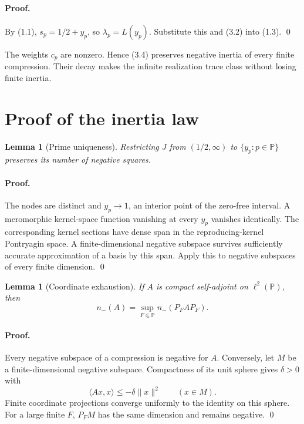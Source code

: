 \documentclass[11pt]{article}
\newtheorem{lemma}[theorem]{Lemma}
\theoremstyle{definition}
\theoremstyle{remark}
\newcommand{\PP}{\mathbb P}
\newcommand{\nm}{n_{-}}
\newcommand{\ip}[2]{\langle #1,#2\rangle}
\newcommand{\norm}[1]{\lVert #1\rVert}
\begin{document}
\paragraph{Proof.}
By (1.1), $s_p=1/2+y_p$, so $\lambda_p=L(y_p)$.  Substitute this and (3.2) into (1.3). \qed

The weights $c_p$ are nonzero.  Hence (3.4) preserves negative inertia of every finite
compression.  Their decay makes the infinite realization trace class without losing finite
inertia.

\section{Proof of the inertia law}
\label{sec:proof}

\begin{lemma}[Prime uniqueness]
\label{lem:unique}
Restricting $J$ from $(1/2,\infty)$ to $\{y_p:p\in\PP\}$ preserves its number of negative
squares.
\end{lemma}

\paragraph{Proof.}
The nodes are distinct and $y_p\to1$, an interior point of the zero-free interval.  A meromorphic
kernel-space function vanishing at every $y_p$ vanishes identically.  The corresponding kernel
sections have dense span in the reproducing-kernel Pontryagin space.  A finite-dimensional
negative subspace survives sufficiently accurate approximation of a basis by this span.  Apply
this to negative subspaces of every finite dimension. \qed

\begin{lemma}[Coordinate exhaustion]
\label{lem:compact}
If $A$ is compact self-adjoint on $\ell^2(\PP)$, then
\begin{equation}
 \nm(A)=\sup_{F\Subset\PP}\nm(P_FAP_F).                    \tag{4.1}
\end{equation}
\end{lemma}

\paragraph{Proof.}
Every negative subspace of a compression is negative for $A$.  Conversely, let $M$ be a
finite-dimensional negative subspace.  Compactness of its unit sphere gives $\delta>0$ with
\[
 \ip{Ax}{x}\leq-\delta\norm{x}^2\qquad(x\in M).
\]
Finite coordinate projections converge uniformly to the identity on this sphere.  For a large
finite $F$, $P_FM$ has the same dimension and remains negative. \qed
\end{document}
